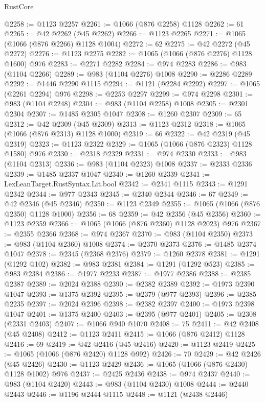 \begin{lexlean}{RustCore}
\begin{coremodule}
@2258 := @1123 @2257
@2261 := @1066 (@876 @2258) @1128
@2262 := 61
@2265 := @42 @2262 (@45 @2262)
@2266 := @1123 @2265
@2271 := @1065 (@1066 (@876 @2266) @1128 @1004)
@2272 := 62
@2275 := @42 @2272 (@45 @2272)
@2276 := @1123 @2275
@2282 := @1065 (@1066 (@876 @2276) @1128 @1600) @976
@2283 := @2271 @2282
@2284 := @974 @2283
@2286 := @983 (@1104 @2266)
@2289 := @983 (@1104 @2276) @1008
@2290 := @2286 @2289
@2292 := @1446 @2290 @1115
@2294 := @1121 (@2284 @2292)
@2297 := @1065 (@2261 @2294) @976
@2298 := @2253 @2297
@2299 := @974 @2298
@2301 := @983 (@1104 @2248)
@2304 := @983 (@1104 @2258) @1008
@2305 := @2301 @2304
@2307 := @1485 @2305 @1047
@2308 := @1260 @2307
@2309 := 65
@2312 := @42 @2309 (@45 @2309)
@2313 := @1123 @2312
@2318 := @1065 (@1066 (@876 @2313) @1128 @1000)
@2319 := 66
@2322 := @42 @2319 (@45 @2319)
@2323 := @1123 @2322
@2329 := @1065 (@1066 (@876 @2323) @1128 @1580) @976
@2330 := @2318 @2329
@2331 := @974 @2330
@2333 := @983 (@1104 @2313)
@2336 := @983 (@1104 @2323) @1008
@2337 := @2333 @2336
@2339 := @1485 @2337 @1047
@2340 := @1260 @2339
@2341 := LexLeanTarget.RustSyntax.Lit.bool
@2342 := @2341 @1115
@2343 := @1291 @2342
@2344 := @977 @2343
@2345 := @2340 @2344
@2346 := 67
@2349 := @42 @2346 (@45 @2346)
@2350 := @1123 @2349
@2355 := @1065 (@1066 (@876 @2350) @1128 @1000)
@2356 := 68
@2359 := @42 @2356 (@45 @2356)
@2360 := @1123 @2359
@2366 := @1065 (@1066 (@876 @2360) @1128 @2023) @976
@2367 := @2355 @2366
@2368 := @974 @2367
@2370 := @983 (@1104 @2350)
@2373 := @983 (@1104 @2360) @1008
@2374 := @2370 @2373
@2376 := @1485 @2374 @1047
@2378 := @2345 (@2368 @2376)
@2379 := @1260 @2378
@2381 := @1291 (@1292 @102)
@2382 := @983 @2381
@2384 := @1291 (@1292 @523)
@2385 := @983 @2384
@2386 := @1977 @2233
@2387 := @1977 @2386
@2388 := @2385 @2387
@2389 := @2024 @2388
@2390 := @2382 @2389
@2392 := @1973 @2390 @1047
@2393 := @1375 @2392
@2395 := @2379 (@977 @2393)
@2396 := @2385 @2235
@2397 := @2024 @2396
@2398 := @2382 @2397
@2400 := @1973 @2398 @1047
@2401 := @1375 @2400
@2403 := @2395 (@977 @2401)
@2405 := @2308 (@2331 @2403)
@2407 := @1066 @940 @1070
@2408 := 75
@2411 := @42 @2408 (@45 @2408)
@2412 := @1123 @2411
@2415 := @1066 (@876 @2412) @1128
@2416 := 69
@2419 := @42 @2416 (@45 @2416)
@2420 := @1123 @2419
@2425 := @1065 (@1066 (@876 @2420) @1128 @992)
@2426 := 70
@2429 := @42 @2426 (@45 @2426)
@2430 := @1123 @2429
@2436 := @1065 (@1066 (@876 @2430) @1128 @1002) @976
@2437 := @2425 @2436
@2438 := @974 @2437
@2440 := @983 (@1104 @2420)
@2443 := @983 (@1104 @2430) @1008
@2444 := @2440 @2443
@2446 := @1196 @2444 @1115
@2448 := @1121 (@2438 @2446)

\end{coremodule}
\end{lexlean}
